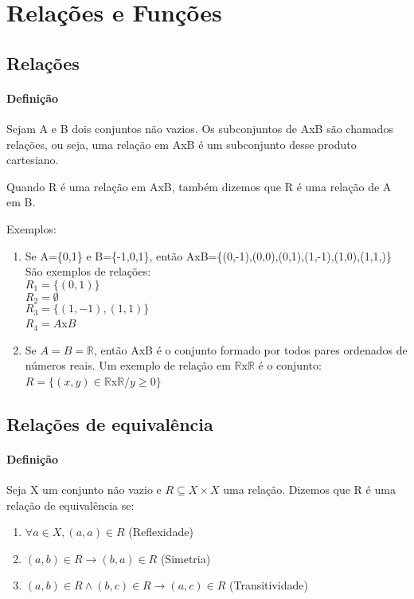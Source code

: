 \chapter{Rela{\c c}{\~o}es e Fun{\c c}{\~o}es}
\section{Rela{\c c}{\~o}es}
\subsubsection{Defini{\c c}{\~a}o}
Sejam A e B dois conjuntos n{\~a}o vazios. Os subconjuntos de AxB s{\~a}o chamados rela{\c c}{\~o}es, ou seja, uma rela{\c c}{\~a}o em AxB {\'e} um subconjunto desse produto cartesiano.

Quando R {\'e} uma rela{\c c}{\~a}o em AxB, tamb{\'e}m dizemos que R {\'e} uma rela{\c c}{\~a}o de A em B.

Exemplos:
\begin{enumerate}
\item Se A=\{0,1\} e B=\{-1,0,1\}, ent{\~a}o AxB=\{(0,-1),(0,0),(0,1),(1,-1),(1,0),(1,1,)\}\\
S{\~a}o exemplos de rela{\c c}{\~o}es:\\
$R_{1}=\{(0,1)\}$\\
$R_{2}=\emptyset$\\
$R_{3}=\{(1,-1),(1,1)\}$\\
$R_{4}=A$x$B$
\item Se $A=B=\mathbb{R}$, ent{\~a}o AxB {\'e} o conjunto formado por todos pares ordenados de n{\'u}meros reais. Um exemplo de rela{\c c}{\~a}o em $\mathbb{R}$x$\mathbb{R}$ {\'e} o conjunto:\\
$R=\{(x,y)\in \mathbb{R}$x$\mathbb{R}/ y\geq 0\}$
\end{enumerate}

\section{Rela{\c c}{\~o}es de equival{\^e}ncia}
\subsubsection{Defini{\c c}{\~a}o}
\begin{definicao} Seja X um conjunto n{\~a}o vazio e $R\subseteq X \times X$ uma rela{\c c}{\~a}o. Dizemos que R {\'e} uma rela{\c c}{\~a}o de equival{\^e}ncia se:
\begin{enumerate}
\item $\forall a \in X,(a,a)\in R$ (Reflexidade)
\item $(a,b)\in R \rightarrow (b,a)\in R$ (Simetria)
\item $(a,b) \in R \wedge (b,c) \in R \rightarrow (a,c)\in R$ (Transitividade)
\end{enumerate}
\end{definicao}

